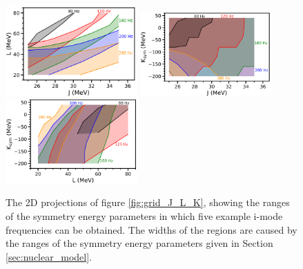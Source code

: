 \documentclass[fleqn,usenatbib]{mnras}
\begin{document}
\begin{figure}
\centering
\includegraphics[width=0.45\textwidth,angle=0]{grid_JL_Kspread.png}
\includegraphics[width=0.45\textwidth,angle=0]{grid_JK_Lspread.png}
\includegraphics[width=0.45\textwidth,angle=0]{grid_LK_Jspread.png}
\caption{The 2D projections of figure \ref{fig:grid_J_L_K}, showing the ranges of the symmetry energy parameters in which five example i-mode frequencies can be obtained. The widths of the regions are caused by the ranges of the symmetry energy parameters given in Section \ref{sec:nuclear_model}.}
\label{fig:freq_contours_plane}
\end{figure}
\end{document}
